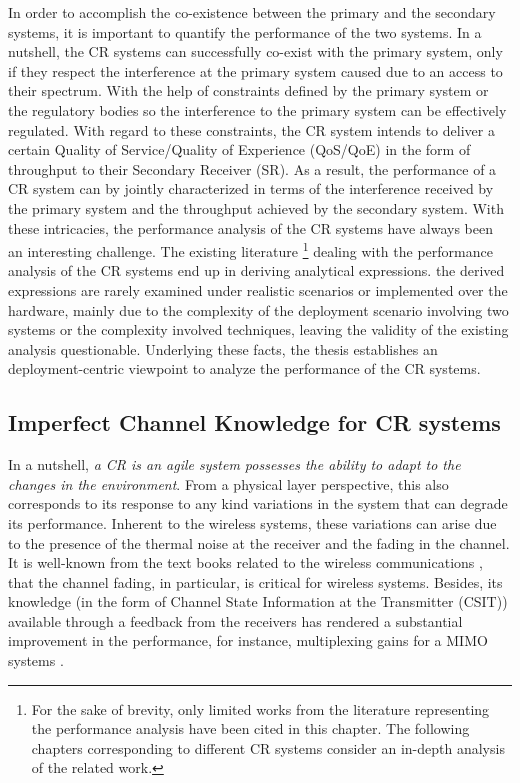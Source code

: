 In order to accomplish the co-existence between the primary and the secondary systems, it is important to quantify the performance of the two systems. In a nutshell, the CR systems can successfully co-exist with the primary system, only if they respect the interference at the primary system caused due to an access to their spectrum. With the help of constraints defined by the primary system or the regulatory bodies so the interference to the primary system can be effectively regulated. With regard to these constraints, the CR system intends to deliver a certain Quality of Service/Quality of Experience (QoS/QoE) in the form of throughput to their Secondary Receiver (SR). As a result, the performance of a CR system can by jointly characterized in terms of the interference received by the primary system and the throughput achieved by the secondary system. With these intricacies, the performance analysis of the CR systems have always been an interesting challenge. The existing literature \cite{Liang08, Kang209, Kang09}\footnote{For the sake of brevity, only limited works from the literature representing the performance analysis have been cited in this chapter. The following chapters corresponding to different CR systems consider an in-depth analysis of the related work.} dealing with the performance analysis of the CR systems end up in deriving analytical expressions. the derived expressions are rarely examined under realistic scenarios or implemented over the hardware, mainly due to the complexity of the deployment scenario involving two systems or the complexity involved techniques, leaving the validity of the existing analysis questionable. Underlying these facts, the thesis establishes an deployment-centric viewpoint to analyze the performance of the CR systems. 

\subsection{Imperfect Channel Knowledge for CR systems}

In a nutshell, \textit{a CR is an agile system possesses the ability to adapt to the changes in the environment}. From a physical layer perspective, this also corresponds to its response to any kind variations in the system that can degrade its performance. Inherent to the wireless systems, these variations can arise due to the presence of the thermal noise at the receiver and the fading in the channel. It is well-known from the text books related to the wireless communications \cite{simon2005, Goldsmith05, Tse05}, that the channel fading, in particular, is critical for wireless systems. Besides, its knowledge (in the form of Channel State Information at the Transmitter (CSIT)) available through a feedback from the receivers has rendered a substantial improvement in the performance, for instance, multiplexing gains for a MIMO systems \cite{Ali12}. 


